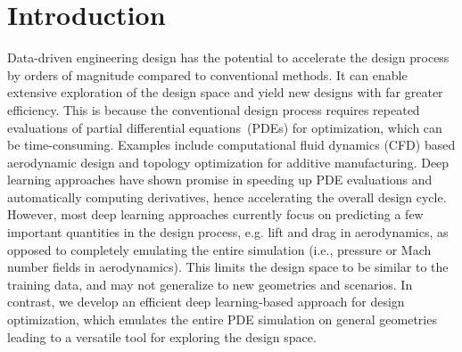 \documentclass{article}
\begin{document}

\section{Introduction}
Data-driven engineering design has the potential to accelerate the design process by orders of magnitude compared to conventional methods. It can enable extensive exploration of the design space and yield new designs with far greater efficiency. This is because the conventional design process requires repeated evaluations of partial differential equations~(PDEs) for optimization, which can be time-consuming. Examples include computational fluid dynamics (CFD) based aerodynamic design and topology optimization for additive manufacturing. 
Deep learning approaches have shown promise in speeding up PDE evaluations and automatically computing derivatives, hence accelerating the overall design cycle.
However, most deep learning approaches currently focus on predicting a few important quantities in the design process, e.g. lift and drag in aerodynamics, as opposed to completely emulating the entire simulation (i.e., pressure or Mach number fields in aerodynamics). This limits the design space to be similar to the training data, and may not generalize to new geometries and scenarios. In contrast, we develop an efficient deep learning-based approach for design optimization, which emulates the entire PDE simulation on general geometries leading to a versatile tool for exploring the design space. 
 
\end{document}
